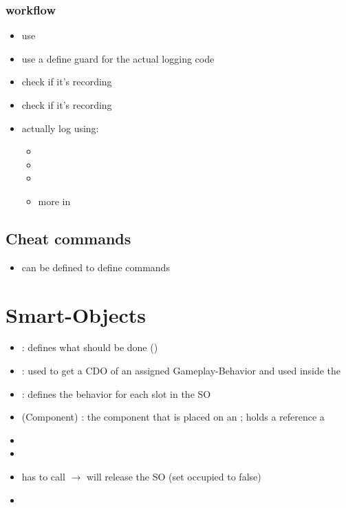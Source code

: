             \subsubsection{workflow}
                \begin{itemize}
                    \item use 
                    \item use a define guard for the actual logging code 
                    \item check if it's recording 
                    \item check if it's recording 
                    \item actually log using:
                    \begin{itemize}
                        \item {}
                        \item {}
                        \item {}
                        \item more in 
                    \end{itemize}
                \end{itemize}

        \subsection{Cheat commands}
            \begin{itemize}
                \item can be defined to define commands
            \end{itemize}


    \section{Smart-Objects}
        \begin{itemize}
            \item {} : defines what should be done ()
            \item {} : used to get a CDO of an assigned Gameplay-Behavior and used inside the 
            \item {} : defines the behavior for each slot in the SO
            \item {}(Component) : the component that is placed on an ; holds a reference a 
            \item \code{}
            \item 
            \item has to call  $\rightarrow$ will release the SO (set occupied to false)
            \item 
        \end{itemize}

